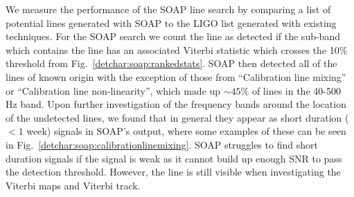We measure the performance of the SOAP line search by comparing a list of potential lines generated with SOAP to the \gls{LIGO} list generated with existing techniques.
For the SOAP search we count the line as detected if the sub-band which
contains the line has an associated Viterbi statistic which crosses the 10\%
threshold from Fig.~\ref{detchar:soap:rankedstats}.  SOAP then detected all of
the lines of known origin with the exception of those 
from ``Calibration line mixing'' or ``Calibration line non-linearity'', which made up $\sim 45\%$ of lines in the 40-500 Hz band.
Upon further investigation of the frequency bands around the location of the undetected lines, we found that in general they appear as
short duration ($< 1$ week) signals in SOAP's output, where some examples of
these can be seen in Fig.~\ref{detchar:soap:calibrationlinemixing}.  SOAP
struggles to find short duration signals if the signal is weak as it cannot
build up enough \gls{SNR} to pass the detection threshold. However, the line is
still visible when investigating the Viterbi maps and Viterbi track. 
%

